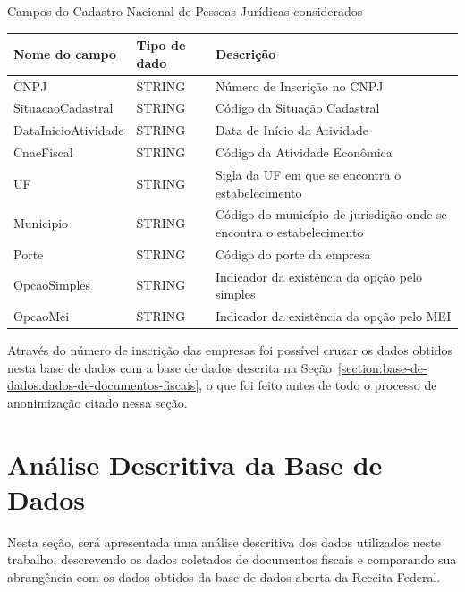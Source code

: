 \begin{quadro}[htb]
\caption{Campos do Cadastro Nacional de Pessoas Jurídicas considerados}
\label{quadro:campos-considerados-cnpj}
\centering
\begin{tabularx}{\textwidth}{|l|l|X|} \hline
\textbf{Nome do campo} & \textbf{Tipo de dado} & \textbf{Descrição}                   \\ \hline
CNPJ                & STRING       & Número de Inscrição no CNPJ                      \\ \hline
SituacaoCadastral   & STRING       & Código da Situação Cadastral                     \\ \hline
DataInicioAtividade & STRING       & Data de Início da Atividade                      \\ \hline
CnaeFiscal          & STRING       & Código da Atividade Econômica                    \\ \hline
UF                  & STRING       & Sigla da UF em que se encontra o estabelecimento \\ \hline
Municipio           & STRING       & Código do município de jurisdição onde se encontra o estabelecimento \\ \hline
Porte               & STRING       & Código do porte da empresa                       \\ \hline
OpcaoSimples        & STRING       & Indicador da existência da opção pelo simples    \\ \hline
OpcaoMei            & STRING       & Indicador da existência da opção pelo MEI        \\ \hline
\end{tabularx}
\end{quadro}

Através do número de inscrição das empresas foi possível cruzar os dados obtidos nesta base de dados com a base de dados descrita na Seção~\ref{section:base-de-dados:dados-de-documentos-fiscais}, o que foi feito antes de todo o processo de anonimização citado nessa seção.

\section{Análise Descritiva da Base de Dados}
\label{section:base-de-dados:analise-descritiva}

Nesta seção, será apresentada uma análise descritiva dos dados utilizados neste trabalho, descrevendo os dados coletados de documentos fiscais e comparando sua abrangência com os dados obtidos da base de dados aberta da Receita Federal.


